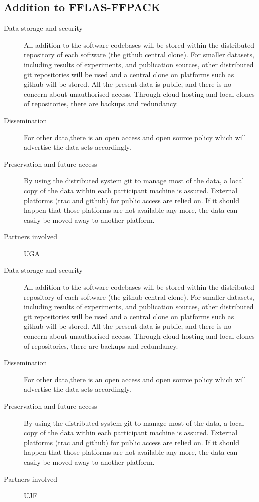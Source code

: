 \documentclass{deliverablereport}
\begin{document}
\begin{enumerate}
\subsection{Addition to FFLAS-FFPACK}

\begin{description}
\item[Data storage and security] All addition to the software codebases will be stored within the distributed repository of each software (the github central clone). For smaller datasets, including results of experiments, and publication sources, other distributed git repositories will be used and a central clone on platforms such as github will be stored. All the present data is public, and there is no concern about unauthorised access. Through cloud hosting and local clones of repositories, there are backups and redundancy.
\item[Dissemination] For other data,there is an open access and open source policy which will advertise the data sets accordingly.
\item[Preservation and future access] By using the distributed system git to manage most of the data, a local copy of the data within each participant machine is assured. External platforms (trac and github) for public access are relied on. If it should happen that those platforms are not available any more, the data can easily be moved away to another platform.
\item[Partners involved] UGA
\end{description}

\begin{description}
\item[Data storage and security] All addition to the software codebases will be stored within the distributed repository of each software (the github central clone). For smaller datasets, including results of experiments, and publication sources, other distributed git repositories will be used and a central clone on platforms such as github will be stored. All the present data is public, and there is no concern about unauthorised access. Through cloud hosting and local clones of repositories, there are backups and redundancy.
\item[Dissemination] For other data,there is an open access and open source policy which will advertise the data sets accordingly.
\item[Preservation and future access] By using the distributed system git to manage most of the data, a local copy of the data within each participant machine is assured. External platforms (trac and github) for public access are relied on. If it should happen that those platforms are not available any more, the data can easily be moved away to another platform.
\item[Partners involved] UJF
\end{description}
\end{enumerate}
\end{document}
